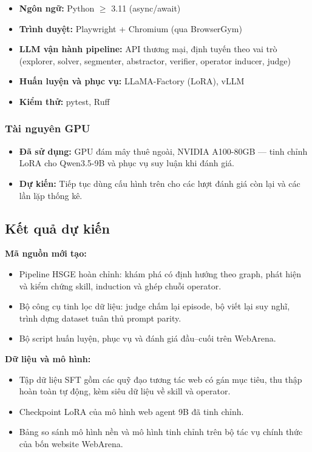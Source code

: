 \documentclass[14pt]{article}
\begin{document}
\begin{itemize}[leftmargin=1.5cm, label=\textbullet]
    \item \textbf{Ngôn ngữ:} Python $\geq$ 3.11 (async/await)
    \item \textbf{Trình duyệt:} Playwright + Chromium (qua BrowserGym)
    \item \textbf{LLM vận hành pipeline:} API thương mại, định tuyến theo vai trò (explorer, solver, segmenter, abstractor, verifier, operator inducer, judge)
    \item \textbf{Huấn luyện và phục vụ:} LLaMA-Factory (LoRA), vLLM
    \item \textbf{Kiểm thử:} pytest, Ruff
\end{itemize}

\subsubsection{Tài nguyên GPU}

\begin{itemize}[leftmargin=1.5cm, label=\textbullet]
    \item \textbf{Đã sử dụng:} GPU đám mây thuê ngoài, NVIDIA A100-80GB --- tinh chỉnh LoRA cho Qwen3.5-9B và phục vụ suy luận khi đánh giá.
    \item \textbf{Dự kiến:} Tiếp tục dùng cấu hình trên cho các lượt đánh giá còn lại và các lần lặp thống kê.
\end{itemize}

\subsection{Kết quả dự kiến}

\textbf{Mã nguồn mới tạo:}
\begin{itemize}[leftmargin=1.5cm, label=\textbullet]
    \item Pipeline HSGE hoàn chỉnh: khám phá có định hướng theo graph, phát hiện và kiểm chứng skill, induction và ghép chuỗi operator.
    \item Bộ công cụ tinh lọc dữ liệu: judge chấm lại episode, bộ viết lại suy nghĩ, trình dựng dataset tuân thủ prompt parity.
    \item Bộ script huấn luyện, phục vụ và đánh giá đầu--cuối trên WebArena.
\end{itemize}

\textbf{Dữ liệu và mô hình:}
\begin{itemize}[leftmargin=1.5cm, label=\textbullet]
    \item Tập dữ liệu SFT gồm các quỹ đạo tương tác web có gán mục tiêu, thu thập hoàn toàn tự động, kèm siêu dữ liệu về skill và operator.
    \item Checkpoint LoRA của mô hình web agent 9B đã tinh chỉnh.
    \item Bảng so sánh mô hình nền và mô hình tinh chỉnh trên bộ tác vụ chính thức của bốn website WebArena.
\end{itemize}
\end{document}
